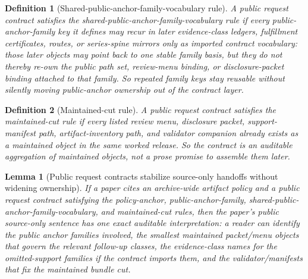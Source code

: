 \documentclass[11pt]{article}
\newtheorem{definition}{Definition}
\newtheorem{lemma}{Lemma}
\begin{document}
\begin{definition}[Shared-public-anchor-family-vocabulary rule]
A public request contract satisfies the \emph{shared-public-anchor-family-vocabulary rule} if every public-anchor-family key it defines may recur in later evidence-class ledgers, fulfillment certificates, routes, or series-spine mirrors only as imported contract vocabulary: those later objects may point back to one stable family basis, but they do not thereby re-own the public path set, review-menu binding, or disclosure-packet binding attached to that family.
So repeated family keys stay reusable without silently moving public-anchor ownership out of the contract layer.
\end{definition}

\begin{definition}[Maintained-cut rule]
A public request contract satisfies the \emph{maintained-cut rule} if every listed review menu, disclosure packet, support-manifest path, artifact-inventory path, and validator companion already exists as a maintained object in the same worked release.
So the contract is an auditable aggregation of maintained objects, not a prose promise to assemble them later.
\end{definition}

\begin{lemma}[Public request contracts stabilize source-only handoffs without widening ownership]
If a paper cites an archive-wide artifact policy and a public request contract satisfying the policy-anchor, public-anchor-family, shared-public-anchor-family-vocabulary, and maintained-cut rules, then the paper's public source-only sentence has one exact auditable interpretation: a reader can identify the public anchor families involved, the smallest maintained packet/menu objects that govern the relevant follow-up classes, the evidence-class names for the omitted-support families if the contract imports them, and the validator/manifests that fix the maintained bundle cut.
\end{lemma}
\end{document}
